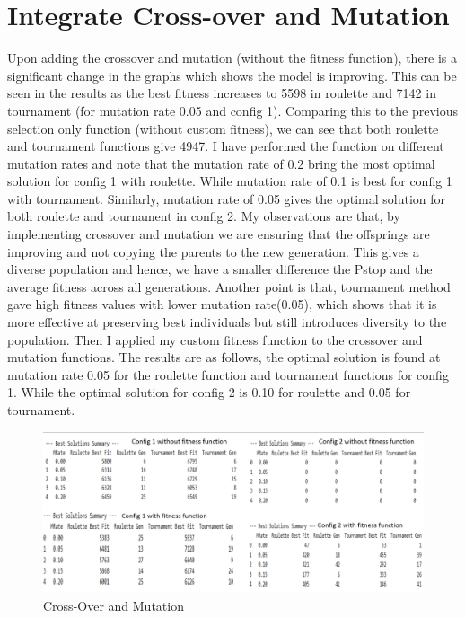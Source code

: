 \documentclass{article}
\begin{document}
\section*{Integrate Cross-over and Mutation}
	Upon adding the crossover and mutation (without the fitness function), there is a significant change in the graphs which shows the model is improving. This can be seen in the results as the best fitness increases to 5598 in roulette and 7142 in tournament (for mutation rate 0.05 and config 1). Comparing this to the previous selection only function (without custom fitness), we can see that both roulette and tournament functions give 4947. I have performed the function on different mutation rates and note that the mutation rate of 0.2 bring the most optimal solution for config 1 with roulette. While mutation rate of 0.1 is best for config 1 with tournament. Similarly, mutation rate of 0.05 gives the optimal solution for both roulette and tournament in config 2. My observations are that, by implementing crossover and mutation we are ensuring that the offsprings are improving and not copying the parents to the new generation. This gives a diverse population and hence, we have a smaller difference the Pstop and the average fitness across all generations. Another point is that, tournament method gave high fitness values with lower mutation rate(0.05), which shows that it is more effective at preserving best individuals but still introduces diversity to the population. Then I applied my custom fitness function to the crossover and mutation functions. The results are as follows, the optimal solution is found at mutation rate 0.05 for the roulette function and tournament functions for config 1. While the optimal solution for config 2 is 0.10 for roulette and 0.05 for tournament. 
\begin{figure}
    \centering
    \includegraphics[width=1\linewidth]{q3.png}
    \caption{Cross-Over and Mutation}
    \label{fig:enter-label}
\end{figure}
\end{document}
